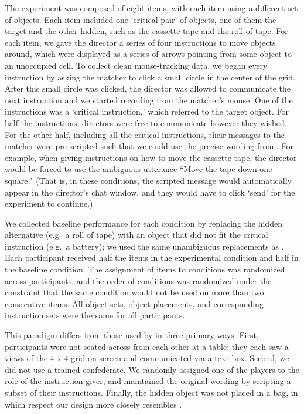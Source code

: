 \documentclass[10pt,letterpaper]{article}
\begin{document}
The experiment was composed of eight items, with each item using a different set of objects. Each item included one `critical pair' of objects, one of them the target and the other hidden, such as the cassette tape and the roll of tape. For each item, we gave the director a series of four instructions to move objects around, which were displayed as a series of arrows pointing from some object to an unoccupied cell. 
To collect clean mouse-tracking data, we began every instruction by asking the matcher to click a small circle in the center of the grid. After this small circle was clicked, the director was allowed to communicate the next instruction and we started recording from the matcher's mouse. 
One of the instructions was a `critical instruction,' which referred to the target object.
For half the instructions, directors were free to communicate however they wished. For the other half, including all the critical instructions, their messages to the matcher were pre-scripted such that we could use the precise wording from . For example, when giving instructions on how to move the cassette tape, the director would be forced to use the ambiguous utterance ``Move the tape down one square." (That is, in these conditions, the scripted message would automatically appear in the director's chat window, and they would have to click `send' for the experiment to continue.)

We collected baseline performance for each condition by replacing the hidden alternative (e.g.~a roll of tape) with an object that did not fit the critical instruction (e.g.~a battery); we used the same unambiguous replacements as . Each participant received half the items in the experimental condition and half in the baseline condition. The assignment of items to conditions was randomized across participants, and the order of conditions was randomized under the constraint that the same condition would not be used on more than two consecutive items. All object sets, object placements, and corresponding instruction sets were the same for all participants.

This paradigm differs from those used by  in three primary ways. First, participants were not seated across from each other at a table: they each saw a views of the 4 x 4 grid on screen and communicated via a text box. Second, we did not use a trained confederate. We randomly assigned one of the players to the role of the instruction giver, and maintained the original wording by scripting a subset of their instructions. Finally, the hidden object was not placed in a bag, in which respect our design more closely resembles .
\end{document}
